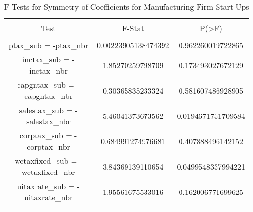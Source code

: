 
\begin{table}[!htbp] \centering 
  \caption{F-Tests for Symmetry of Coefficients for Manufacturing Firm Start Ups} 
  \label{} 
\begin{tabular}{@{\extracolsep{5pt}} ccc} 
\\[-1.8ex]\hline 
\hline \\[-1.8ex] 
Test & F-Stat & P(\textgreater F) \\ 
\hline \\[-1.8ex] 
ptax\_sub = -ptax\_nbr & 0.00223905138474392 & 0.962260019722865 \\ 
inctax\_sub = -inctax\_nbr & 1.85270259798709 & 0.173493027672129 \\ 
capgntax\_sub = -capgntax\_nbr & 0.30365835233324 & 0.581607486928905 \\ 
salestax\_sub = -salestax\_nbr & 5.46041373673562 & 0.0194671731709584 \\ 
corptax\_sub = -corptax\_nbr & 0.684991274976681 & 0.407888496142152 \\ 
wctaxfixed\_sub = -wctaxfixed\_nbr & 3.84369139110654 & 0.0499548337994221 \\ 
uitaxrate\_sub = -uitaxrate\_nbr & 1.95561675533016 & 0.162006771699625 \\ 
\hline \\[-1.8ex] 
\end{tabular} 
\end{table} 
